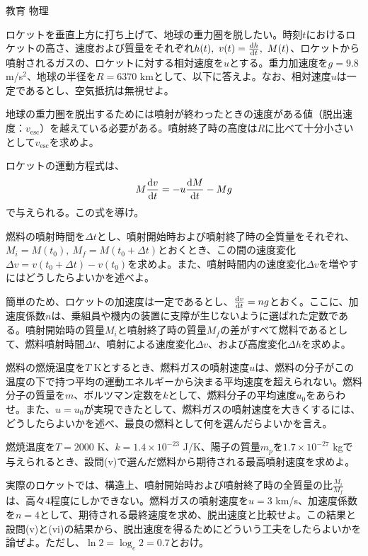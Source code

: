 \documentclass[fleqn]{jbook}
\begin{document}
\begin{question}{教育 物理}{}

\begin{subquestions}
\SubQuestion
ロケットを垂直上方に打ち上げて、地球の重力圏を脱したい。時刻$t$におけるロケットの高さ、速度および質量をそれぞれ$h(t),\ v(t)=\frac{\d{h}}{\d{t}},\ M(t)$、ロケットから噴射されるガスの、ロケットに対する相対速度を$u$とする。重力加速度を$g=9.8$ m/s$^2$、地球の半径を$R=6370$ kmとして、以下に答えよ。なお、相対速度$u$は一定であるとし、空気抵抗は無視せよ。

\begin{subsubquestions}
\SubSubQuestion
地球の重力圏を脱出するためには噴射が終わったときの速度がある値（脱出速度：$v_{\text{esc}}$）を越えている必要がある。噴射終了時の高度は$R$に比べて十分小さいとして$v_{\text{esc}}$を求めよ。

\SubSubQuestion
ロケットの運動方程式は、
\[
M\frac{{\rm d}v}{{\rm d}t} = -u\frac{{\rm d}M}{{\rm d}t} - Mg
\]
で与えられる。この式を導け。

\SubSubQuestion
燃料の噴射時間を$\Delta t$とし、噴射開始時および噴射終了時の全質量をそれぞれ、$M_i=M(t_0),\ M_f=M(t_0+\Delta t)$とおくとき、この間の速度変化$\Delta v=v(t_0+\Delta t)-v(t_0)$を求めよ。また、噴射時間内の速度変化$\Delta v$を増やすにはどうしたらよいかを述べよ。

\SubSubQuestion
簡単のため、ロケットの加速度は一定であるとし、$\frac{{\rm d}v}{{\rm d}t}=ng$とおく。ここに、加速度係数$n$は、乗組員や機内の装置に支障が生じないように選ばれた定数である。噴射開始時の質量$M_i$と噴射終了時の質量$M_f$の差がすべて燃料であるとして、燃料噴射時間$\Delta t$、噴射による速度変化$\Delta v$、および高度変化$\Delta h$を求めよ。

\SubSubQuestion
燃料の燃焼温度を$T$ Kとするとき、燃料ガスの噴射速度$u$は、燃料の分子がこの温度の下で持つ平均の運動エネルギーから決まる平均速度を超えられない。燃料分子の質量を$m$、ボルツマン定数を$k$として、燃料分子の平均速度$u_0$をあらわせ。また、$u=u_0$が実現できたとして、燃料ガスの噴射速度を大きくするには、どうしたらよいかを述べ、最良の燃料として何を選んだらよいかを言え。

\SubSubQuestion
燃焼温度を$T=2000$ K、$k=1.4\times 10^{-23}$ J/K、陽子の質量$m_p$を$1.7\times 10^{-27}$ kgで与えられるとき、設問(v)で選んだ燃料から期待される最高噴射速度を求めよ。

\SubSubQuestion
実際のロケットでは、構造上、噴射開始時および噴射終了時の全質量の比$\frac{M_i}{M_f}$は、高々4程度にしかできない。燃料ガスの噴射速度を$u=3$ km/s、加速度係数を$n=4$として、期待される最終速度を求め、脱出速度と比較せよ。この結果と設問(v)と(vi)の結果から、脱出速度を得るためにどういう工夫をしたらよいかを論ぜよ。ただし、$\ln 2=\log_e 2=0.7$とおけ。


\end{subsubquestions}
\end{subquestions}
\end{question}
\end{document}
